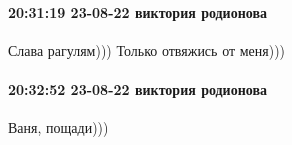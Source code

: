  
 
 
 
 

\paragraph{20:31:19 23-08-22 виктория родионова}

Слава рагулям))) Только отвяжись от меня)))

\paragraph{20:32:52 23-08-22 виктория родионова}
Ваня, пощади)))
